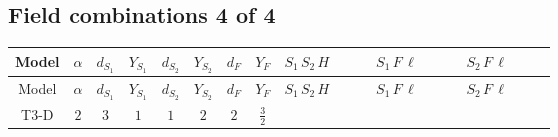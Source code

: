 \documentclass[8pt]{article}
\begin{document}
\begin{landscape}
\subsection*{Field combinations 4 of 4}
\begin{longtable}{@{}cccccccc >{\raggedright\arraybackslash}p{0.21\linewidth} >{\raggedright\arraybackslash}p{0.21\linewidth} >{\raggedright\arraybackslash}p{0.21\linewidth}@{}}
\toprule
Model & $\alpha$ & $d_{S_1}$ & $Y_{S_1}$ & $d_{S_2}$ & $Y_{S_2}$ & $d_F$ & $Y_F$ & $S_1\,S_2\,H$ & $S_1\,F\,\ell$ & $S_2\,F\,\ell$ \\
\midrule
\endfirsthead
\toprule
Model & $\alpha$ & $d_{S_1}$ & $Y_{S_1}$ & $d_{S_2}$ & $Y_{S_2}$ & $d_F$ & $Y_F$ & $S_1\,S_2\,H$ & $S_1\,F\,\ell$ & $S_2\,F\,\ell$ \\
\midrule
\endhead
T3-D & $2$ & $3$ & $1$ & $1$ & $2$ & $2$ & $\frac{3}{2}$ & \scriptsize\adjustbox{max width=\linewidth}{$\begin{gathered} +H_{a_1} H_{a_2} S_{1,j_1} \mathcal{I}_{T3,a_1,a_2,j_1} \lambda_5 S_2{}^{\dagger } \\ +\overline{\lambda_5} S_2 {\mathcal{I}_{LLS_1S_2}}^{*}_{a_1,a_2,j_1} H_{a_1}{}^{\dagger } H_{a_2}{}^{\dagger } S_{1,j_1}{}^{\dagger }\end{gathered}$} & \scriptsize\adjustbox{max width=\linewidth}{$\begin{gathered} +\overline{L_{a_1,i_1}}\, C\, P_R\, \overline{F_{j_1,r_1}}{}^T S_{1,j_1} y_{1,i_1,r_1} \mathcal{I}_{y_1,a_1,j_1,j_1} \\ +\overline{y_{1,i_1,r_1}} L_{a_1,i_1}{}^T\, C\, P_L\, F_{j_1,r_1} {\mathcal{C}_{LS_1F}}^{*}_{a_1,j_1,j_1} S_{1,j_1}{}^{\dagger }\end{gathered}$} & \scriptsize\adjustbox{max width=\linewidth}{$\begin{gathered} +\overline{y_{2,i_1,r_1}} \overline{F_{j_1,r_1}}\, P_L\, L_{a_1,i_1} S_2 {\mathcal{C}_{LS_2F}}^{*}_{a_1,j_1} \\ +\overline{L_{a_1,i_1}}\, P_R\, F_{j_1,r_1} y_{2,i_1,r_1} \mathcal{I}_{y_2,a_1,j_1} S_2{}^{\dagger }\end{gathered}$} \\
\midrule
\bottomrule
\end{longtable}
\end{landscape}
\end{document}
